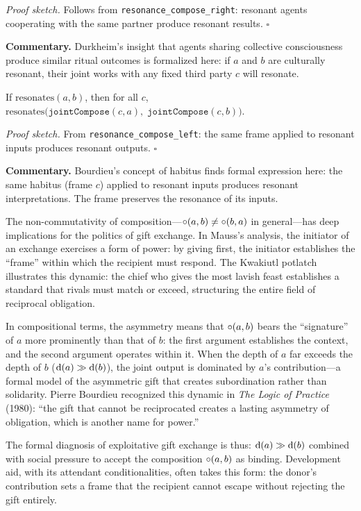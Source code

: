 \noindent\textit{Proof sketch.}\quad
Follows from \texttt{resonance\_compose\_right}: resonant agents cooperating
with the same partner produce resonant results.
\hfill$\square$

\medskip

\noindent\textbf{Commentary.}
Durkheim's insight that agents sharing collective consciousness produce
similar ritual outcomes is formalized here: if $a$ and $b$ are culturally
resonant, their joint works with any fixed third party $c$ will resonate.

\begin{theorem}
\label{thm:joint_resonance_left}
If $\text{resonates}(a, b)$, then for all $c$,
$\text{resonates}\bigl(\texttt{jointCompose}(c, a),\; \texttt{jointCompose}(c, b)\bigr)$.
\end{theorem}

\noindent\textit{Proof sketch.}\quad
From \texttt{resonance\_compose\_left}: the same frame applied to resonant
inputs produces resonant outputs.
\hfill$\square$

\medskip

\noindent\textbf{Commentary.}
Bourdieu's concept of habitus finds formal expression here: the same habitus
(frame $c$) applied to resonant inputs produces resonant interpretations.
The frame preserves the resonance of its inputs.

\begin{remark}
\label{rem:asymmetry-power}
The non-commutativity of composition---$\circ(a, b) \neq \circ(b, a)$
in general---has deep implications for the politics of gift exchange.
In Mauss's analysis, the initiator of an exchange exercises a form of
power: by giving first, the initiator establishes the ``frame'' within
which the recipient must respond.  The Kwakiutl potlatch illustrates
this dynamic: the chief who gives the most lavish feast establishes a
standard that rivals must match or exceed, structuring the entire field
of reciprocal obligation.

In compositional terms, the asymmetry means that $\circ(a, b)$ bears
the ``signature'' of $a$ more prominently than that of $b$: the first
argument establishes the context, and the second argument operates
within it.  When the depth of $a$ far exceeds the depth of $b$
($\operatorname{d}(a) \gg \operatorname{d}(b)$), the joint output is dominated by $a$'s
contribution---a formal model of the asymmetric gift that creates
subordination rather than solidarity.  Pierre Bourdieu recognized this
dynamic in \textit{The Logic of Practice} (1980): ``the gift that
cannot be reciprocated creates a lasting asymmetry of obligation, which
is another name for power.''

The formal diagnosis of exploitative gift exchange is thus:
$\operatorname{d}(a) \gg \operatorname{d}(b)$ combined with social pressure to accept the
composition $\circ(a, b)$ as binding.  Development aid, with its
attendant conditionalities, often takes this form: the donor's
contribution sets a frame that the recipient cannot escape without
rejecting the gift entirely.
\end{remark}

